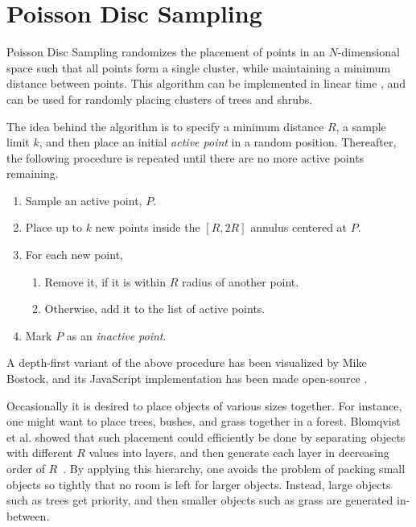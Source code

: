 \section{Poisson Disc Sampling}

Poisson Disc Sampling randomizes the placement of points in an $N$-dimensional space such that all points form a single cluster, while maintaining a minimum distance between points.
This algorithm can be implemented in linear time \cite{poisson_fast}, and can be used for randomly placing clusters of trees and shrubs.


The idea behind the algorithm is to specify a minimum distance $R$, a sample limit $k$, and then place an initial \textit{active point} in a random position.
Thereafter, the following procedure is repeated until there are no more active points remaining.
\vspace{-0.5cm} %
\begin{enumerate}
  \item Sample an active point, $P$.
  \item Place up to $k$ new points inside the $[R, 2R]$ annulus centered at $P$.
  \item For each new point,
  \begin{enumerate}
    \item Remove it, if it is within $R$ radius of another point.
    \item Otherwise, add it to the list of active points.
  \end{enumerate}
  \item Mark $P$ as an \textit{inactive point}.
\end{enumerate}

A depth-first variant of the above procedure has been visualized by Mike Bostock, and its JavaScript implementation has been made open-source \cite{poisson_demo}.

Occasionally it is desired to place objects of various sizes together.
For instance, one might want to place trees, bushes, and grass together in a forest.
Blomqvist et al. showed that such placement could efficiently be done by separating objects with different $R$ values into layers, and then generate each layer in decreasing order of $R$~\cite[p.32]{ba_landscape}.
By applying this hierarchy, one avoids the problem of packing small objects so tightly that no room is left for larger objects.
Instead, large objects such as trees get priority, and then smaller objects such as grass are generated in-between.